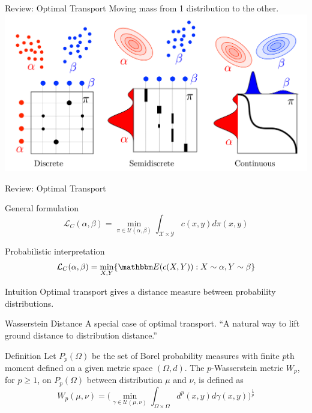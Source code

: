 \documentclass{beamer}
\newcommand{\mbm}{\mathbbm}
\newcommand{\set}[1]{\{#1\}}
\begin{document}
\begin{frame}{Review: Optimal Transport}
  Moving mass from 1 distribution to the other.
  \includegraphics[width=\textwidth]{images/transport.png}
\end{frame}


\begin{frame}{Review: Optimal Transport}
  \begin{block}{General formulation}
    \[\mathcal L_C(\alpha, \beta) = \min_{\pi \in \mathcal U(\alpha,
        \beta)}\int_{\mathcal X\times \mathcal Y} c(x,y)d\pi(x,y)\]
  \end{block}
  \begin{block}{Probabilistic interpretation}
    \[\mathcal L_C(\alpha, \beta) = \min_{X, Y} \set{\mbm E(c(X,Y)) : X \sim \alpha,
        Y\sim \beta}\]
  \end{block}
  \begin{block}{Intuition}
    Optimal transport gives a distance measure between probability distributions.
  \end{block}
\end{frame}

\begin{frame}{Wasserstein Distance}
  A special case of optimal transport. ``A natural way to lift ground distance
  to distribution distance.''
  \begin{block}{Definition}
    Let $P_p(\Omega)$ be the set of Borel probability measures with finite $p$th
    moment defined on a given metric space $(\Omega, d)$. The $p$-Wasserstein
    metric $W_p$, for $p\geq1$, on $P_p(\Omega)$ between distribution $\mu$ and
    $\nu$, is defined as
    \[W_p(\mu, \nu)=\Big(\min_{\gamma\in \mathcal U(\mu, \nu)}\int_{\Omega\times
        \Omega}d^p(x,y)d\gamma(x,y)\Big)^{\frac{1}{p}}\]
  \end{block}
\end{frame}
\end{document}
